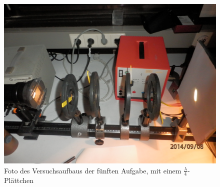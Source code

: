 \documentclass[12pt]{scrartcl}
\begin{document}
\begin{figure}[H]
\centering
    \includegraphics[scale = 0.1]{aufgabe_5_2.JPG}
  	\caption[Foto des Versuchsaufbaus der fünften Aufgabe, mit einem $\frac{\lambda}{4}$-Plättchen]{Foto des Versuchsaufbaus der fünften Aufgabe, mit einem $\frac{\lambda}{4}$-Plättchen}
  \label{fig:aufgabe_2}
\end{figure}
\end{document}

